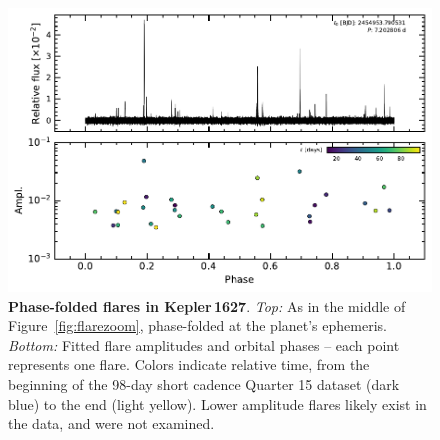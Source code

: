 \documentclass[12pt,modern,twocolumn,tighten]{aastex63}
\begin{document}
\begin{figure}[t]
	\begin{center}
		\leavevmode
		\includegraphics[width=1.0\textwidth]{f8.pdf}
	\end{center}
	\vspace{-0.7cm}
	\caption{
		{\bf Phase-folded flares in Kepler\,1627}.  
    {\it Top:}
    As in the middle of Figure~\ref{fig:flarezoom}, phase-folded at
    the planet's ephemeris.
    {\it Bottom:}
    Fitted flare amplitudes and orbital phases -- each point
    represents one flare.
    Colors indicate relative time, from the beginning of the
    98-day short cadence Quarter 15 dataset (dark blue) to the end (light
    yellow).
    Lower amplitude flares likely exist in the data, and were not
    examined.
		\label{fig:flarephase}
	}
\end{figure}
\end{document}
